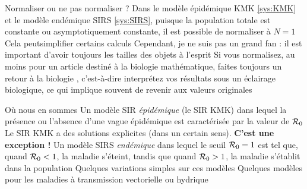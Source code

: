 \documentclass[aspectratio=169]{beamer}\usepackage[]{graphicx}\usepackage[]{xcolor}
\begin{document}
\begin{frame}{Normaliser ou ne pas normaliser ?}
\bbullet Dans le modèle épidémique KMK \eqref{sys:KMK} et le modèle endémique SIRS \eqref{sys:SIRS}, puisque la population totale est constante ou asymptotiquement constante, il est possible de normaliser à $N=1$
\vfill
\bbullet Cela peutsimplifier certains calculs
\vfill
\bbullet Cependant, je ne suis pas un grand fan : il est important d'avoir toujours les \guillemetleft tailles \guillemetright des objets à l'esprit
\vfill
\bbullet Si vous normalisez, au moins pour un article destiné à la biologie mathématique, faites toujours un \guillemetleft retour à la biologie \guillemetright, c'est-à-dire interprétez vos résultats sous un éclairage biologique, ce qui implique souvent de revenir aux valeurs originales
\end{frame}

\begin{frame}{Où nous en sommes}
\bbullet Un modèle SIR \emph{épidémique} (le SIR KMK) dans lequel la présence ou l'absence d'une vague épidémique est caractérisée par la valeur de $\mathcal{R}_0$
\vfill
\bbullet Le SIR KMK a des solutions explicites (dans un certain sens). \textbf{C'est une exception !}
\vfill
\bbullet Un modèle SIRS \emph{endémique} dans lequel le seuil $\mathcal{R}_0=1$ est tel que, quand $\mathcal{R}_0<1$, la maladie s'éteint, tandis que quand $\mathcal{R}_0>1$, la maladie s'établit dans la population
\vfill
\bbullet Quelques variations simples sur ces modèles
\vfill
\bbullet Quelques modèles pour les maladies à transmission vectorielle ou hydrique
\end{frame}
\end{document}
